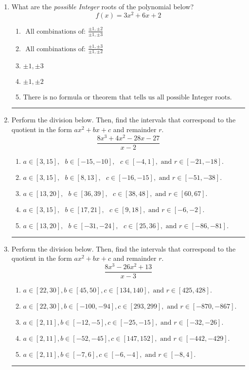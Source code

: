\documentclass[14pt]{extbook}
\newcommand{\litem}[1]{\item#1\hspace*{-1cm}\rule{\textwidth}{0.4pt}}
\begin{document}
\begin{enumerate}
{\begin{enumerate}[label=\Alph*.]
\end{enumerate} }
\litem{
What are the \textit{possible Integer} roots of the polynomial below?\[ f(x) = 3x^{2} +6 x + 2 \]\begin{enumerate}[label=\Alph*.]
\item \( \text{ All combinations of: }\frac{\pm 1,\pm 2}{\pm 1,\pm 3} \)
\item \( \text{ All combinations of: }\frac{\pm 1,\pm 3}{\pm 1,\pm 2} \)
\item \( \pm 1,\pm 3 \)
\item \( \pm 1,\pm 2 \)
\item \( \text{There is no formula or theorem that tells us all possible Integer roots.} \)

\end{enumerate} }
\litem{
Perform the division below. Then, find the intervals that correspond to the quotient in the form $ax^2+bx+c$ and remainder $r$.\[ \frac{8x^{3} +4 x^{2} -28 x -27}{x -2} \]\begin{enumerate}[label=\Alph*.]
\item \( a \in [3, 15], \text{   } b \in [-15, -10], \text{   } c \in [-4, 1], \text{   and   } r \in [-21, -18]. \)
\item \( a \in [3, 15], \text{   } b \in [8, 13], \text{   } c \in [-16, -15], \text{   and   } r \in [-51, -38]. \)
\item \( a \in [13, 20], \text{   } b \in [36, 39], \text{   } c \in [38, 48], \text{   and   } r \in [60, 67]. \)
\item \( a \in [3, 15], \text{   } b \in [17, 21], \text{   } c \in [9, 18], \text{   and   } r \in [-6, -2]. \)
\item \( a \in [13, 20], \text{   } b \in [-31, -24], \text{   } c \in [25, 36], \text{   and   } r \in [-86, -81]. \)

\end{enumerate} }
\litem{
Perform the division below. Then, find the intervals that correspond to the quotient in the form $ax^2+bx+c$ and remainder $r$.\[ \frac{8x^{3} -26 x^{2} + 13}{x -3} \]\begin{enumerate}[label=\Alph*.]
\item \( a \in [22, 30], b \in [45, 50], c \in [134, 140], \text{ and } r \in [425, 428]. \)
\item \( a \in [22, 30], b \in [-100, -94], c \in [293, 299], \text{ and } r \in [-870, -867]. \)
\item \( a \in [2, 11], b \in [-12, -5], c \in [-25, -15], \text{ and } r \in [-32, -26]. \)
\item \( a \in [2, 11], b \in [-52, -45], c \in [147, 152], \text{ and } r \in [-442, -429]. \)
\item \( a \in [2, 11], b \in [-7, 6], c \in [-6, -4], \text{ and } r \in [-8, 4]. \)


\end{enumerate}}
\end{enumerate}
\end{document}
